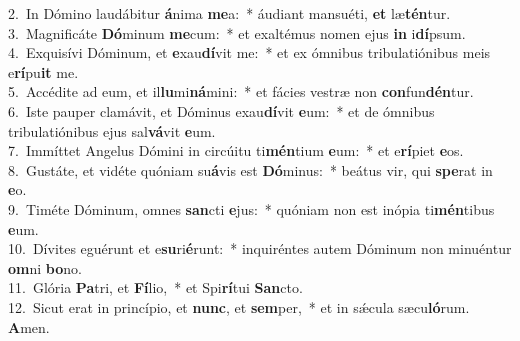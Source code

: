 {2.~}In Dómino laudábitur \textbf{á}nima \textbf{me}a:~* áudiant mansuéti, \textbf{et} læ\textbf{tén}tur.\\
{3.~}Magnificáte \textbf{Dó}minum \textbf{me}cum:~* et exaltémus nomen ejus \textbf{in} i\textbf{dí}psum.\\
{4.~}Exquisívi Dóminum, et \textbf{e}xau\textbf{dí}vit me:~* et ex ómnibus tribulatiónibus meis e\textbf{rí}pu\textbf{it} me.\\
{5.~}Accédite ad eum, et il\textbf{lu}mi\textbf{ná}mini:~* et fácies vestræ non \textbf{con}fun\textbf{dén}tur.\\
{6.~}Iste pauper clamávit, et Dóminus exau\textbf{dí}vit \textbf{e}um:~* et de ómnibus tribulatiónibus ejus sal\textbf{vá}vit \textbf{e}um.\\
{7.~}Immíttet Angelus Dómini in circúitu ti\textbf{mén}tium \textbf{e}um:~* et e\textbf{rí}piet \textbf{e}os.\\
{8.~}Gustáte, et vidéte quóniam su\textbf{á}vis est \textbf{Dó}minus:~* beátus vir, qui \textbf{spe}rat in \textbf{e}o.\\
{9.~}Timéte Dóminum, omnes \textbf{san}cti \textbf{e}jus:~* quóniam non est inópia ti\textbf{mén}tibus \textbf{e}um.\\
{10.~}Dívites eguérunt et e\textbf{su}ri\textbf{é}runt:~* inquiréntes autem Dóminum non minuéntur \textbf{om}ni \textbf{bo}no.\\
{11.~}Glória \textbf{Pa}tri, et \textbf{Fí}lio,~* et Spi\textbf{rí}tui \textbf{San}cto.\\
{12.~}Sicut erat in princípio, et \textbf{nunc}, et \textbf{sem}per,~* et in sǽcula sæcu\textbf{ló}rum. \textbf{A}men.\\
